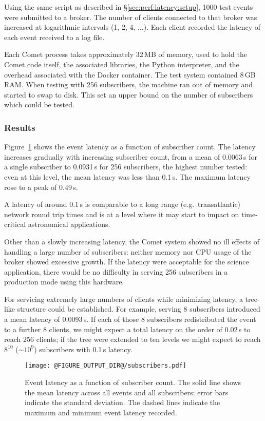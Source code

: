 \documentclass[5p,authoryear]{elsarticle}
\begin{document}
Using the same script as described in \S\ref{sec:perf:latency:setup}, 1000
test events were submitted to a broker. The number of clients connected to
that broker was increased at logarithmic intervals (1, 2, 4, ...). Each client
recorded the latency of each event received to a log file.

Each Comet process takes approximately 32\,MB of memory, used to hold the
Comet code itself, the associated libraries, the Python interpreter, and the
overhead associated with the Docker container. The test system contained 8\,GB
RAM\@. When testing with 256 subscribers, the machine ran out of memory and
started to swap to disk. This set an upper bound on the number of subscribers
which could be tested.

\subsubsection{Results}

Figure~\ref{fig:subscribers} shows the event latency as a function of
subscriber count. The latency increases gradually with increasing subscriber
count, from a mean of 0.0063\,s for a single subscriber to 0.0931\,s for 256
subscribers, the highest number tested: even at this level, the mean latency
was less than 0.1\,s. The maximum latency rose to a peak of 0.49\,s.

A latency of around 0.1\,s is comparable to a long range (e.g.\ transatlantic)
network round trip times and is at a level where it may start to impact on
time-critical astronomical applications.

Other than a slowly increasing latency, the Comet system showed no
ill effects of handling a large number of subscribers: neither memory nor CPU
usage of the broker showed excessive growth. If the latency were acceptable
for the science application, there would be no difficulty in serving 256
subscribers in a production mode using this hardware.

For servicing extremely large numbers of clients while minimizing latency, a
tree-like structure could be established. For example, serving 8 subscribers
introduced a mean latency of 0.0093\,s. If each of those 8 subscribers
redistributed the event to a further 8 clients, we might expect a total
latency on the order of 0.02\,s to reach 256 clients; if the tree were
extended to ten levels we might expect to reach $8^{10}$ ($\sim10^9$)
subscribers with 0.1\,s latency.

\begin{figure}
  \begin{center}
  \texttt{[image: @FIGURE\_OUTPUT\_DIR@/subscribers.pdf]}
  \end{center}

  \caption{Event latency as a function of subscriber count. The solid line
  shows the mean latency across all events and all subscribers; error bars
  indicate the standard deviation. The dashed lines indicate the maximum and
  minimum event latency recorded.}

  \label{fig:subscribers}
\end{figure}
\end{document}
